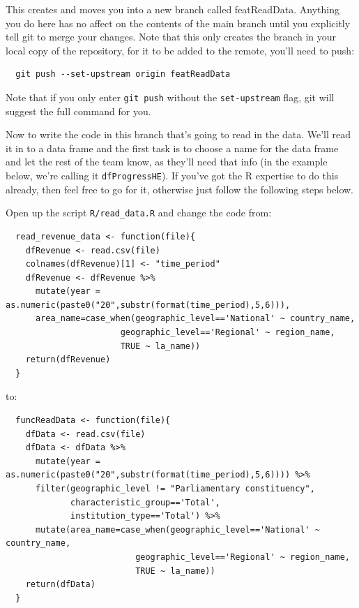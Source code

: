 \documentclass[
  12pt,
]{article}
\begin{document}
This creates and moves you into a new branch called featReadData.
Anything you do here has no affect on the contents of the main branch
until you explicitly tell git to merge your changes. Note that this only
creates the branch in your local copy of the repository, for it to be
added to the remote, you'll need to push:

\begin{verbatim}
  git push --set-upstream origin featReadData
\end{verbatim}

Note that if you only enter \texttt{git\ push} without the
\texttt{set-upstream} flag, git will suggest the full command for you.

Now to write the code in this branch that's going to read in the data.
We'll read it in to a data frame and the first task is to choose a name
for the data frame and let the rest of the team know, as they'll need
that info (in the example below, we're calling it
\texttt{dfProgressHE}). If you've got the R expertise to do this
already, then feel free to go for it, otherwise just follow the
following steps below.

Open up the script \texttt{R/read\_data.R} and change the code from:

\begin{verbatim}
  read_revenue_data <- function(file){
    dfRevenue <- read.csv(file)
    colnames(dfRevenue)[1] <- "time_period"
    dfRevenue <- dfRevenue %>% 
      mutate(year = as.numeric(paste0("20",substr(format(time_period),5,6))),
      area_name=case_when(geographic_level=='National' ~ country_name,
                       geographic_level=='Regional' ~ region_name,
                       TRUE ~ la_name))
    return(dfRevenue)
  }
\end{verbatim}

to:

\begin{verbatim}
  funcReadData <- function(file){
    dfData <- read.csv(file)
    dfData <- dfData %>% 
      mutate(year = as.numeric(paste0("20",substr(format(time_period),5,6)))) %>%
      filter(geographic_level != "Parliamentary constituency",
             characteristic_group=='Total',
             institution_type=='Total') %>%
      mutate(area_name=case_when(geographic_level=='National' ~ country_name,
                          geographic_level=='Regional' ~ region_name,
                          TRUE ~ la_name))
    return(dfData)
  }
\end{verbatim}
\end{document}
